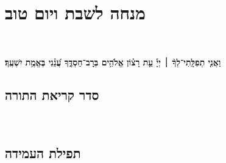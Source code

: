 \documentclass[twoside, openany, parskip=half, 11pt]{book}
\begin{document}
\vfill
{}


\sepline



%
\blankpage
\chapter[מנחה לשבת ויו״ט]{ מנחה לשבת ויום טוב }
\tamid

\ketoret
\sepline\\

\ashrei

\uvaletzion

\halfkaddish


\textbf{
וַאֲנִ֤י תְפִלָּֽתִי־לְךָ֨ ׀ יְיָ֡ עֵ֤ת רָצ֗וֹן אֱלֹהִ֥ים בְּרׇב־חַסְדֶּ֑ךָ עֲ֝נֵ֗נִי בֶּאֱמֶ֥ת יִשְׁעֶֽךָ׃ } 

\section[סדר קריאת התורה]{ סדר קריאת התורה }


\pesicha

\brikhshmei

\gadlu

\avharachamim

\vesigale


\torahbarachu

\hagomel

\nextpage
\hagbaha

\yehalelu

\\
\kafdalet

\nextpage
\etzchaim

\label{shabYTamidah}
\halfkaddish

\section[תפילת העמידה]{ תפילת העמידה }


\amidaopening{\shabbosshuva}{}

\weekdaysakedusha

\sepline
\end{document}
